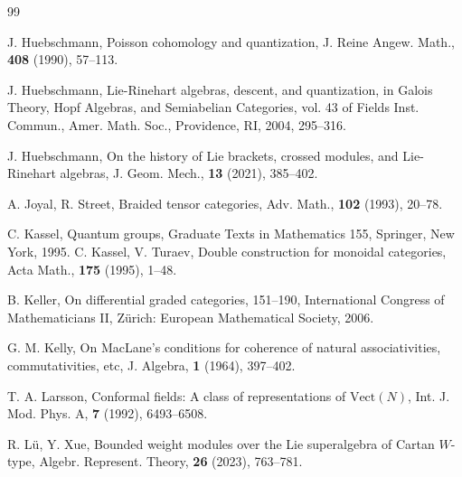 \documentclass[11pt]{amsart}
\theoremstyle{definition}
\numberwithin{equation}{section}
\begin{document}
\begin{thebibliography}{99}
	
	 J. Huebschmann, Poisson cohomology and quantization, J. Reine Angew. Math., {\bf 408} (1990), 57--113.
	
	 J. Huebschmann, Lie-Rinehart algebras, descent, and quantization, in Galois Theory, Hopf Algebras, and Semiabelian Categories, vol. 43 of Fields Inst. Commun., Amer. Math. Soc., Providence, RI, 2004, 295--316.
	
	 J. Huebschmann, On the history of Lie brackets, crossed modules, and Lie-Rinehart algebras,
	J. Geom. Mech., {\bf 13} (2021), 385--402.
	
	
	
	 A. Joyal, R. Street, Braided tensor categories, Adv. Math., {\bf 102} (1993), 20--78.
	
	 C. Kassel, Quantum groups, Graduate Texts in Mathematics 155, Springer, New York, 1995.
	 C. Kassel,  V. Turaev,  Double construction for monoidal categories, Acta Math., {\bf 175} (1995),  1--48.	
	
	 B. Keller, On differential graded categories, 151--190,  International Congress of Mathematicians II, Z\"urich: European Mathematical Society, 2006.
	
	 G. M. Kelly, On MacLane's conditions for coherence of natural associativities, commutativities, etc, J. Algebra, {\bf 1} (1964), 397--402.
	
	
	
	 T. A. Larsson, Conformal fields: A class of representations of $\mathrm{Vect}(N)$, Int. J. Mod. Phys. A,  {\bf 7} (1992), 6493--6508. 
	
	 R. L\"{u}, Y. Xue, Bounded weight modules over the Lie superalgebra of Cartan $W$-type, Algebr. Represent. Theory, {\bf 26} (2023),  763--781.
	
	
	

\end{thebibliography}
\end{document}
